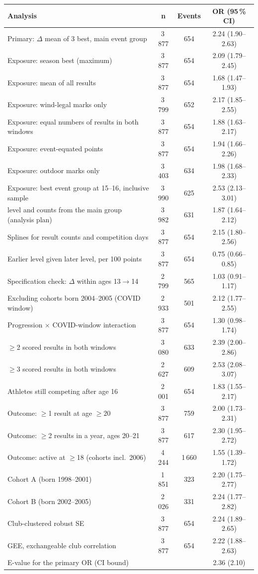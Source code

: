 \begin{tabular}{lccc}
\toprule
Analysis & n & Events & OR (95\,\% CI) \\
\midrule
Primary: $\Delta$ mean of 3 best, main event group & 3\,877 & 654 & 2.24 (1.90--2.63) \\
Exposure: season best (maximum) & 3\,877 & 654 & 2.09 (1.79--2.45) \\
Exposure: mean of all results & 3\,877 & 654 & 1.68 (1.47--1.93) \\
Exposure: wind-legal marks only & 3\,799 & 652 & 2.17 (1.85--2.55) \\
Exposure: equal numbers of results in both windows & 3\,877 & 654 & 1.88 (1.63--2.17) \\
Exposure: event-equated points & 3\,877 & 654 & 1.94 (1.66--2.26) \\
Exposure: outdoor marks only & 3\,403 & 634 & 1.98 (1.68--2.33) \\
Exposure: best event group at 15--16, inclusive sample & 3\,990 & 625 & 2.53 (2.13--3.01) \\
\quad level and counts from the main group (analysis plan) & 3\,982 & 631 & 1.87 (1.64--2.12) \\
Splines for result counts and competition days & 3\,877 & 654 & 2.15 (1.80--2.56) \\
Earlier level given later level, per 100 points & 3\,877 & 654 & 0.75 (0.66--0.85) \\
Specification check: $\Delta$ within ages 13$\to$14 & 2\,799 & 565 & 1.03 (0.91--1.17) \\
Excluding cohorts born 2004--2005 (COVID window) & 2\,933 & 501 & 2.12 (1.77--2.55) \\
Progression $\times$ COVID-window interaction & 3\,877 & 654 & 1.30 (0.98--1.74) \\
$\geq$2 scored results in both windows & 3\,080 & 633 & 2.39 (2.00--2.86) \\
$\geq$3 scored results in both windows & 2\,627 & 609 & 2.53 (2.08--3.07) \\
Athletes still competing after age 16 & 2\,001 & 654 & 1.83 (1.55--2.17) \\
Outcome: $\geq$1 result at age $\geq$20 & 3\,877 & 759 & 2.00 (1.73--2.31) \\
Outcome: $\geq$2 results in a year, ages 20--21 & 3\,877 & 617 & 2.30 (1.95--2.72) \\
Outcome: active at $\geq$18 (cohorts incl.\ 2006) & 4\,244 & 1\,660 & 1.55 (1.39--1.72) \\
Cohort A (born 1998--2001) & 1\,851 & 323 & 2.20 (1.75--2.77) \\
Cohort B (born 2002--2005) & 2\,026 & 331 & 2.24 (1.77--2.82) \\
Club-clustered robust SE & 3\,877 & 654 & 2.24 (1.89--2.65) \\
GEE, exchangeable club correlation & 3\,877 & 654 & 2.22 (1.88--2.63) \\
E-value for the primary OR (CI bound) &  &  & 2.36 (2.10) \\
\bottomrule
\end{tabular}
